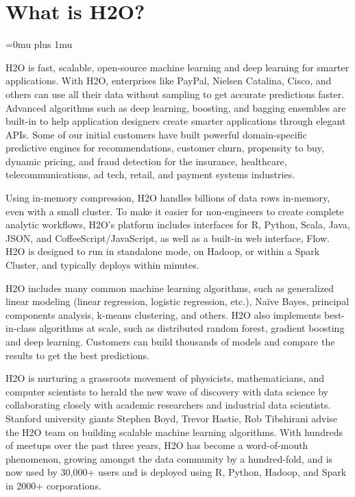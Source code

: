 \section{What is H2O?}
\Urlmuskip=0mu plus 1mu\relax %


H2O is fast, scalable, open-source machine learning and deep learning for smarter applications. With H2O, enterprises like PayPal, Nielsen Catalina, Cisco, and others can use all their data without sampling to get accurate predictions faster. Advanced algorithms such as deep learning, boosting, and bagging ensembles are built-in to help application designers create smarter applications through elegant APIs. Some of our initial customers have built powerful domain-specific predictive engines for recommendations, customer churn, propensity to buy, dynamic pricing, and fraud detection for the insurance, healthcare, telecommunications, ad tech, retail, and payment systems industries.

Using in-memory compression, H2O handles billions of data rows in-memory, even with a small cluster. To make it easier for non-engineers to create complete analytic workflows, H2O's platform includes interfaces for R, Python, Scala, Java, JSON, and CoffeeScript/JavaScript, as well as a built-in  web interface, Flow. H2O is designed to run in standalone mode, on Hadoop, or within a Spark Cluster, and typically deploys within minutes.

H2O includes many common machine learning algorithms, such as generalized linear modeling (linear regression, logistic regression, etc.), Na\"{i}ve Bayes, principal components analysis, k-means clustering, and others. H2O also implements best-in-class algorithms at scale, such as distributed random forest, gradient boosting and deep learning. Customers can build thousands of models and compare the results to get the best predictions.

H2O is nurturing a grassroots movement of physicists, mathematicians, and computer scientists to herald the new wave of discovery with data science by collaborating closely with academic researchers and industrial data scientists. Stanford university giants Stephen Boyd, Trevor Hastie, Rob Tibshirani advise the H2O team on building scalable machine learning algorithms. With hundreds of meetups over the past three years, H2O has become a word-of-mouth phenomenon, growing amongst the data community by a hundred-fold, and is now used by 30,000+ users and is deployed using R, Python, Hadoop, and Spark in 2000+ corporations.


